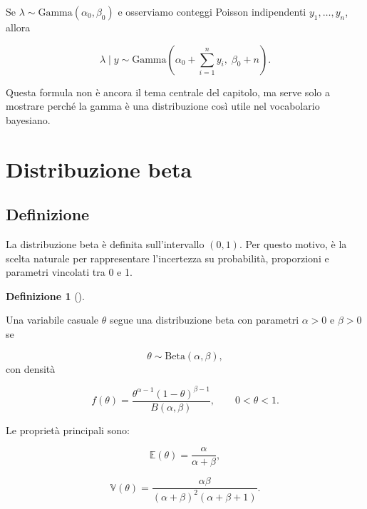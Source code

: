 \documentclass[
  italian,
  letterpaper,
  a4paper,
  11pt,
  open=any]{scrbook}
\theoremstyle{plain}
\theoremstyle{definition}
\theoremstyle{definition}
\newtheorem{definition}{Definizione}[chapter]
\theoremstyle{remark}
\begin{document}
\begin{tcolorbox}[enhanced jigsaw, arc=.35mm, bottomrule=.15mm, bottomtitle=1mm, breakable, colback=white, colbacktitle=quarto-callout-tip-color!10!white, colframe=quarto-callout-tip-color-frame, coltitle=black, left=2mm, leftrule=.75mm, opacityback=0, opacitybacktitle=0.6, rightrule=.15mm, title=\textcolor{quarto-callout-tip-color}{\faLightbulb}\hspace{0.5em}{Anticipazione: aggiornamento Gamma-Poisson}, titlerule=0mm, toprule=.15mm, toptitle=1mm]

Se \(\lambda \sim \mathrm{Gamma}(\alpha_0,\beta_0)\) e osserviamo
conteggi Poisson indipendenti \(y_1,\ldots,y_n\), allora

\[
\lambda \mid y \sim
\mathrm{Gamma}\left(\alpha_0 + \sum_{i=1}^n y_i,\; \beta_0+n\right).
\]

Questa formula non è ancora il tema centrale del capitolo, ma serve solo
a mostrare perché la gamma è una distribuzione così utile nel
vocabolario bayesiano.

\end{tcolorbox}

\section{Distribuzione beta}\label{sec-cont-beta}

\subsection{Definizione}\label{definizione-8}

La distribuzione beta è definita sull'intervallo \((0,1)\). Per questo
motivo, è la scelta naturale per rappresentare l'incertezza su
probabilità, proporzioni e parametri vincolati tra 0 e 1.

\begin{definition}[]\protect\hypertarget{def-beta}{}\label{def-beta}

Una variabile casuale \(\theta\) segue una distribuzione beta con
parametri \(\alpha > 0\) e \(\beta > 0\) se

\[
\theta \sim \mathrm{Beta}(\alpha,\beta),
\] con densità

\[
f(\theta) = \frac{\theta^{\alpha-1}(1-\theta)^{\beta-1}}{B(\alpha,\beta)},
\qquad 0 < \theta < 1.
\]

Le proprietà principali sono:

\[
\mathbb{E}(\theta)=\frac{\alpha}{\alpha+\beta},
\]

\[
\mathbb{V}(\theta)=
\frac{\alpha\beta}{(\alpha+\beta)^2(\alpha+\beta+1)}.
\]

\end{definition}
\end{document}
